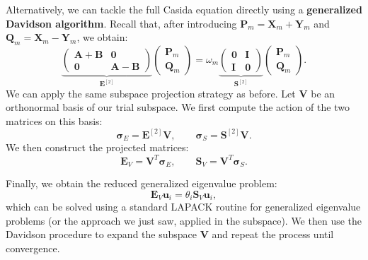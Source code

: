 \documentclass[10pt,aspectratio=169]{beamer}
\begin{document}
\begin{frame}
	Alternatively, we can tackle the full Casida equation directly using a \textbf{generalized Davidson algorithm}.
	Recall that, after introducing $\mathbf P_m=\mathbf X_m+\mathbf Y_m$ and $\mathbf Q_m=\mathbf X_m-\mathbf Y_m$, we obtain:
	\begin{equation*}
		\underbrace{
			\begin{pmatrix}
				\mathbf A+\mathbf B & \mathbf 0\\
				\mathbf 0 & \mathbf A-\mathbf B
			\end{pmatrix}
		}_{\mathbf E^{[2]}}
		\begin{pmatrix}
			\mathbf P_m\\
			\mathbf Q_m
		\end{pmatrix}
		=
		\omega_m
		\underbrace{
			\begin{pmatrix}
				\mathbf 0 & \mathbf I\\
				\mathbf I & \mathbf 0
			\end{pmatrix}
		}_{\mathbf S^{[2]}}
		\begin{pmatrix}
			\mathbf P_m\\
			\mathbf Q_m
		\end{pmatrix}.
	\end{equation*}
	\pause
	We can apply the same subspace projection strategy as before. Let $\mathbf V$ be an orthonormal basis of our trial subspace. We first compute the action of the two matrices on this basis:
	\begin{equation*}
		\boldsymbol{\sigma}_E=\mathbf E^{[2]}\mathbf V,
		\qquad
		\boldsymbol{\sigma}_S=\mathbf S^{[2]}\mathbf V.
	\end{equation*}
	We then construct the projected matrices:
	\begin{equation*}
		\mathbf E_V=\mathbf V^T\boldsymbol{\sigma}_E,
		\qquad
		\mathbf S_V=\mathbf V^T\boldsymbol{\sigma}_S.
	\end{equation*}
	
	Finally, we obtain the reduced generalized eigenvalue problem:
	\begin{equation}
		\boxed{\mathbf E_V\mathbf u_i=\theta_i\mathbf S_V\mathbf u_i,} \label{eq:generalized_davidson}
	\end{equation}
	which can be solved using a standard LAPACK routine for generalized eigenvalue problems (or the approach we just saw, applied in the subspace).
	We then use the Davidson procedure to expand the subspace $\mathbf V$ and repeat the process until convergence.
\end{frame}
\end{document}

